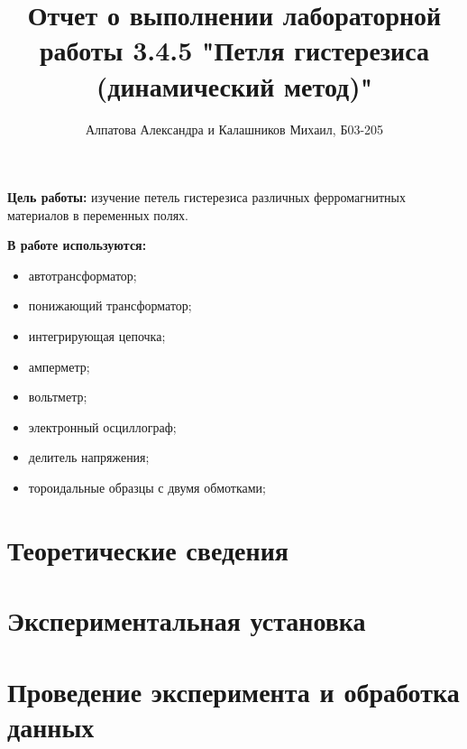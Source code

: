\documentclass[14pt, a4paper]{report}
\title{\textbf{Отчет о выполнении лабораторной работы 3.4.5 "Петля гистерезиса (динамический метод)"}}
\author{Алпатова Александра и Калашников Михаил, Б03-205}
\date{}
\begin{document}
\maketitle

\textbf{Цель работы:}
изучение петель гистерезиса различных ферромагнитных материалов в переменных полях.
\newline

\textbf{В работе используются:}
\begin{itemize}
\item автотрансформатор;
\item понижающий трансформатор;
\item интегрирующая цепочка;
\item амперметр;
\item вольтметр;
\item электронный осциллограф;
\item делитель напряжения;
\item тороидальные образцы с двумя обмотками;
\end{itemize}

\section{Теоретические сведения}



\section{Экспериментальная установка}



\section{Проведение эксперимента и обработка данных}
\end{document}
